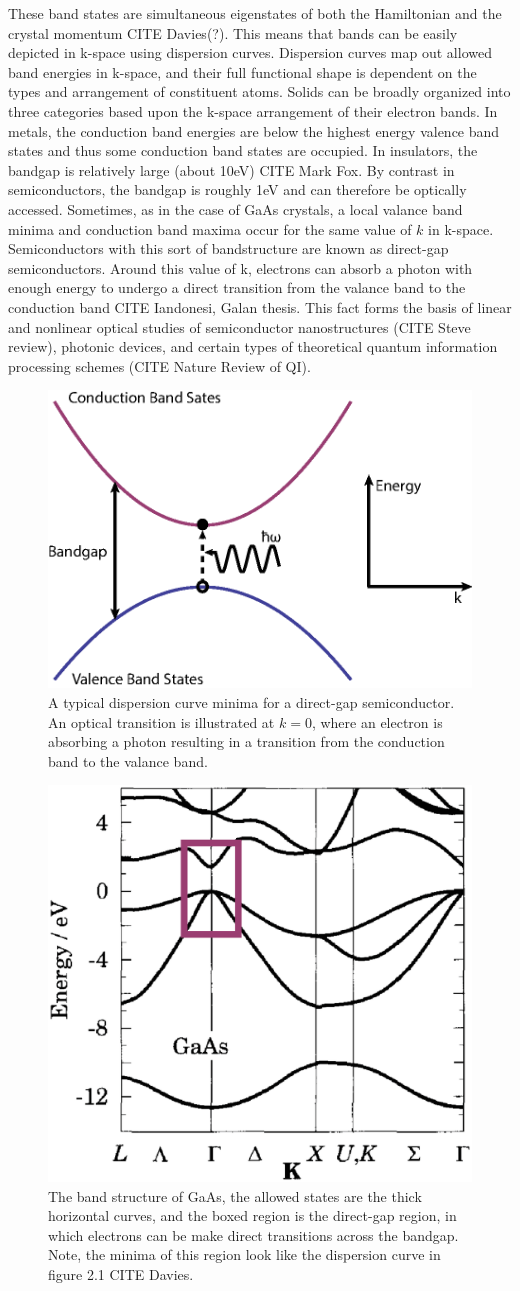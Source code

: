 \indent These band states are simultaneous eigenstates of both the Hamiltonian and the crystal momentum CITE Davies(?). This means that bands can be easily depicted in k-space using dispersion curves. Dispersion curves map out allowed band energies in k-space, and their full functional shape is dependent on the types and arrangement of constituent atoms.  Solids can be broadly organized into three categories based upon the k-space arrangement of their electron bands. In metals, the conduction band energies are below the highest energy valence band states and thus some conduction band states are occupied. In insulators, the bandgap is relatively large (about 10eV) CITE Mark Fox. By contrast in semiconductors, the bandgap is roughly 1eV and can therefore be optically accessed. Sometimes, as in the case of GaAs crystals, a local valance band minima and conduction band maxima occur for the same value of $k$ in k-space. Semiconductors with this sort of bandstructure are known as direct-gap semiconductors. Around this value of k, electrons can absorb a photon with enough energy to undergo a direct transition from the valance band to the conduction band  CITE Iandonesi, Galan thesis. This fact forms the basis of linear and nonlinear optical studies of semiconductor nanostructures (CITE Steve review), photonic devices, and certain types of theoretical quantum information processing schemes (CITE Nature Review of QI).

\begin{figure}[h]
\centering
\includegraphics[width = .4\textwidth]{dispcurve.eps}
\caption{ \doublespacing A typical dispersion curve minima for a direct-gap semiconductor. An optical transition is illustrated at $k = 0$, where an electron is absorbing a photon resulting in a transition from the conduction band to the valance band.}
\label{ExampleBands}
\end{figure}

\begin{figure}[h!]
\centering
\includegraphics[width = .3\textwidth]{GaAsBstruct.eps}
\caption{\doublespacing The band structure of GaAs, the allowed states are the thick horizontal curves, and the boxed region is the direct-gap region, in which electrons can be make direct transitions across the bandgap. Note, the minima of this region look like the dispersion curve in figure 2.1 CITE Davies.}
\label{GaAsBstruct}
\end{figure}


